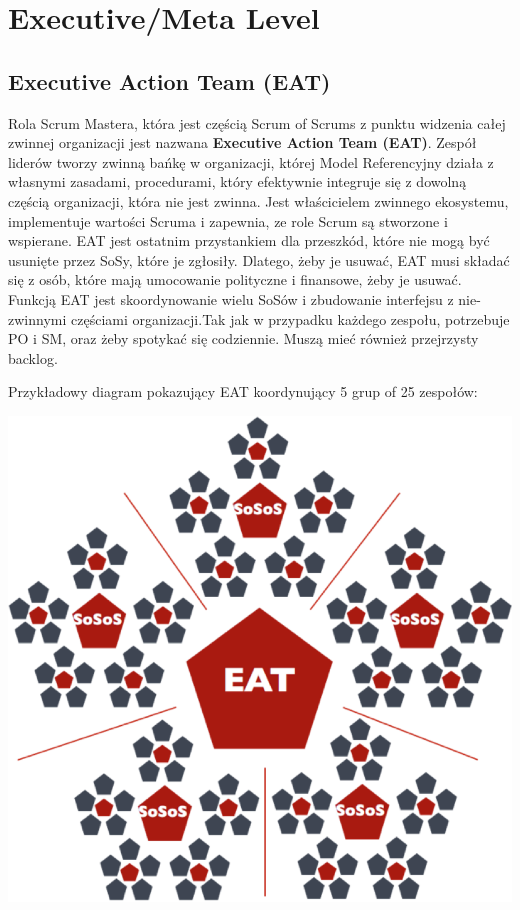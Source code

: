 \documentclass[12pt,a4paper,parskip=full]{scrartcl}
\begin{document}
\section{Executive/Meta Level}

\subsection{Executive Action Team (EAT)}

Rola Scrum Mastera, która jest częścią Scrum of Scrums z punktu widzenia całej zwinnej organizacji jest nazwana \textbf{Executive Action Team (EAT)}. Zespół liderów tworzy zwinną bańkę w organizacji, której Model Referencyjny działa z własnymi zasadami, procedurami, który efektywnie integruje się z dowolną częścią organizacji, która nie jest zwinna. Jest właścicielem zwinnego ekosystemu, implementuje wartości Scruma i zapewnia, ze role Scrum są stworzone i wspierane.
EAT jest ostatnim przystankiem dla przeszkód, które nie mogą być usunięte przez SoSy, które je zgłosiły. Dlatego, żeby je usuwać, EAT musi składać się z osób, które mają umocowanie polityczne i finansowe, żeby je usuwać. Funkcją EAT jest skoordynowanie wielu SoSów i zbudowanie interfejsu z nie-zwinnymi częściami organizacji.Tak jak w przypadku każdego zespołu, potrzebuje PO i SM, oraz żeby spotykać się codziennie. Muszą mieć również przejrzysty backlog.

Przykładowy diagram pokazujący EAT koordynujący 5 grup of 25 zespołów:

\includegraphics[width=\textwidth,height=\textheight,keepaspectratio]{SoS-EAT.png}
\end{document}
